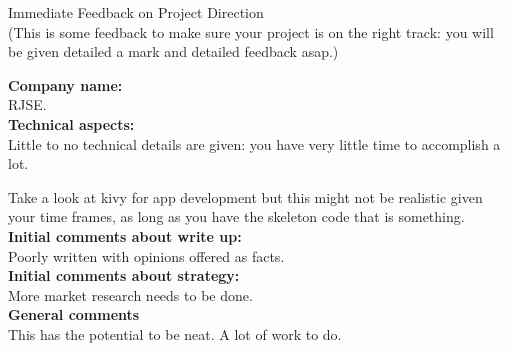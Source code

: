 \documentclass{article}
\begin{document}
\begin{center}
\Huge{Immediate Feedback on Project Direction}\\
\tiny{(This is some feedback to make sure your project is on the right track: you will be given detailed a mark and detailed feedback asap.)}
\end{center}


\normalsize
\textbf{Company name:}\\

RJSE. \\

\textbf{Technical aspects:}\\

Little to no technical details are given: you have very little time to accomplish a lot.

Take a look at kivy for app development but this might not be realistic given your time frames, as long as you have the skeleton code that is something.\\

\textbf{Initial comments about write up:}\\

Poorly written with opinions offered as facts.\\

\textbf{Initial comments about strategy:}\\

More market research needs to be done.\\

\textbf{General comments}\\

This has the potential to be neat. A lot of work to do.
\end{document}
